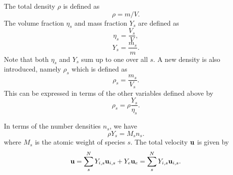 \documentclass[a4paper,11pt]{report}
\begin{document}
The total density $\rho$ is defined as
\begin{equation}
    \rho = m/V.
\end{equation}
The volume fraction $\eta_s$ and mass fraction $Y_s$ are defined as
\begin{equation}
    \eta_s = \frac{V_s}{V},
\end{equation}
\begin{equation}
    Y_s = \frac{m_s}{m}.
\end{equation}
Note that both $\eta_s$ and $Y_s$ sum up to one over all $s$. A new density is also introduced, namely $\rho_s$ which is defined as
\begin{equation}
    \rho_s = \frac{m_s}{V_s}.
\end{equation}
This can be expressed in terms of the other variables defined above by
\begin{equation}
    \rho_s = \rho \frac{Y_s}{\eta_s}.
\end{equation}

In terms of the number densities $n_s$, we have
\begin{equation}
    \label{eq:sf_mass_number_densities}
    \rho Y_s = M_s n_s.
\end{equation}
where $M_s$ is the atomic weight of species $s$. The total velocity $\mathbf{u}$ is given by
\begin{equation}
    \label{eq:sf_common_vel}
    \mathbf{u} = \sum_s^N Y_{i,s} \mathbf{u}_{i,s} + Y_e \mathbf{u}_e = \sum_s^N Y_{i,s} \mathbf{u}_{i,s}.
\end{equation}

\end{document}
